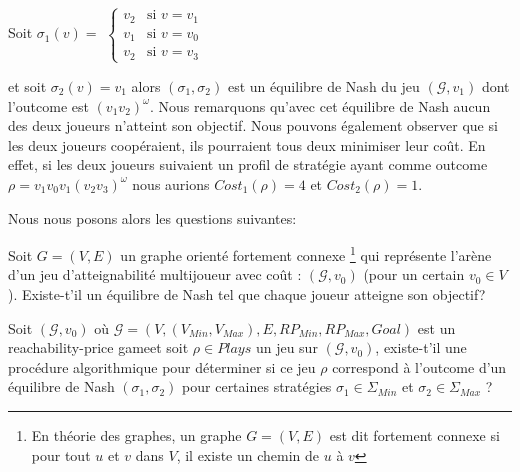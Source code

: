 Soit $\sigma _{1}(v) =$ $\begin{cases}
						v_{2} & \text{si } v = v_{1} \\
						v_{1 } & \text{si } v = v_{0} \\
						v_{2} & \text{si } v = v_{3} 
						\end{cases}$
						
						
						
\noindent et soit $\sigma _{2}(v) = v_{1}$ alors $(\sigma _{1},\sigma _{2})$ est un équilibre de Nash du jeu $(\mathcal{G},v_{1})$ dont l'outcome est $(v_{1}v_{2})^{\omega}$. Nous remarquons qu'avec cet équilibre de Nash aucun des deux joueurs n'atteint son objectif. Nous pouvons également observer que si les deux joueurs coopéraient, ils pourraient tous deux minimiser leur coût. En effet, si les deux joueurs suivaient un profil de stratégie ayant comme outcome $\rho = v_{1}v_{0}v_{1}(v_{2}v_{3})^{\omega} $ nous aurions $Cost_{1}(\rho) = 4$ et $Cost_{2}(\rho) = 1$.

Nous nous posons alors les questions suivantes:

\begin{qst}
	
	Soit $G = (V,E)$ un graphe orienté fortement connexe \footnote{En théorie des graphes, un graphe $G = (V,E)$ est dit fortement connexe si pour tout $u$ et $v$ dans $V$, il existe un chemin de $u$ à $v$} qui représente l'arène d'un jeu d'atteignabilité multijoueur avec coût : $(\mathcal{G},v_{0})$ (pour un certain $v_{0} \in V$).
Existe-t'il un équilibre de Nash tel que chaque joueur atteigne son objectif?

\end{qst}
	

\begin{qst}
	\label{qst:2}
	Soit $(\mathcal{G},v_{0})$ où $\mathcal{G} = (V,(V_{Min},V_{Max}),E,RP_{Min},RP_{Max},Goal)$ est un \og reachability-price game\fg  et soit $\rho \in Plays$ un jeu sur $(\mathcal{G},v_{0})$, existe-t'il une procédure algorithmique pour déterminer si ce jeu $\rho$ correspond à l'outcome d'un équilibre de Nash $(\sigma _{1},\sigma _{2})$ pour certaines stratégies $\sigma _{1}\in \Sigma _{Min}$ et $\sigma _{2}\in \Sigma _{Max}$ ?
	
\end{qst}

